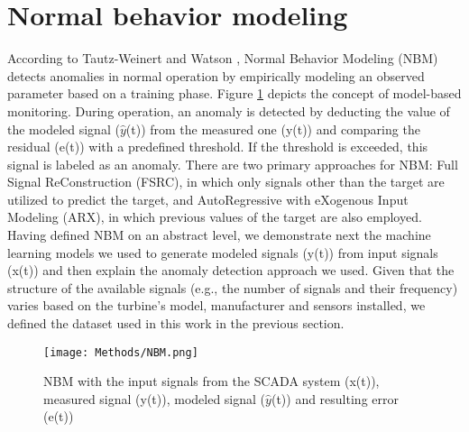 \clearpage

\section{Normal behavior modeling}
According to Tautz-Weinert and Watson \cite{SCADA_NBM_Review}, Normal Behavior Modeling (NBM) detects anomalies in normal operation by empirically modeling an 
observed parameter based on a training phase. Figure \ref{fig:NBM} depicts the concept of model-based monitoring.
During operation, an anomaly is detected by deducting the value of the modeled signal ($\hat{y}$(t)) from the measured one (y(t))  and 
comparing the residual (e(t)) with a predefined threshold. If the threshold is exceeded, this signal is labeled as an anomaly.
There are two primary approaches for NBM: Full Signal ReConstruction (FSRC), in which only signals other than the target are utilized to predict the target, 
and AutoRegressive with eXogenous Input Modeling (ARX), in which previous values of the target are also employed.\\
Having defined NBM on an abstract level, we demonstrate next the machine learning models we used to generate modeled signals (y(t)) from input signals (x(t)) and 
then explain the anomaly detection approach we used. Given that the structure of the available signals (e.g., the number of signals and their frequency) varies based 
on the turbine's model, manufacturer and sensors installed, we defined the dataset used in this work in the previous section.

\begin{figure}[H]
  \begin{center}
    \texttt{[image: Methods/NBM.png]}
  \end{center}
  \caption{NBM with the input signals from the SCADA system (x(t)), measured signal (y(t)), modeled signal ($\hat{y}$(t)) and resulting error (e(t))}
  \label{fig:NBM}
\end{figure}


